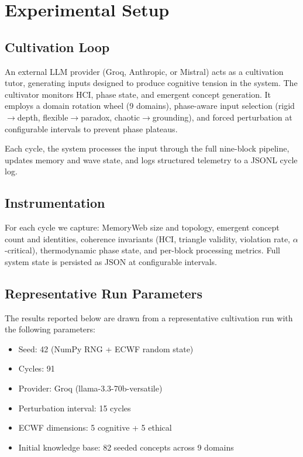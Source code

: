 \documentclass[11pt,a4paper]{article}
\begin{document}
\section{Experimental Setup}

\subsection{Cultivation Loop}

An external LLM provider (Groq, Anthropic, or Mistral) acts as a cultivation 
tutor, generating inputs designed to produce cognitive tension in the system. 
The cultivator monitors HCI, phase state, and emergent concept generation. It 
employs a domain rotation wheel (9 domains), phase-aware input selection 
(rigid$\to$depth, flexible$\to$paradox, chaotic$\to$grounding), and forced 
perturbation at configurable intervals to prevent phase plateaus.

Each cycle, the system processes the input through the full nine-block 
pipeline, updates memory and wave state, and logs structured telemetry 
to a JSONL cycle log.

\subsection{Instrumentation}

For each cycle we capture: MemoryWeb size and topology, emergent concept 
count and identities, coherence invariants (HCI, triangle validity, violation 
rate, $\alpha$-critical), thermodynamic phase state, and per-block processing 
metrics. Full system state is persisted as JSON at configurable intervals.

\subsection{Representative Run Parameters}

The results reported below are drawn from a representative cultivation run 
with the following parameters:

\begin{itemize}[nosep]
    \item Seed: 42 (NumPy RNG + ECWF random state)
    \item Cycles: 91
    \item Provider: Groq (llama-3.3-70b-versatile)
    \item Perturbation interval: 15 cycles
    \item ECWF dimensions: 5 cognitive + 5 ethical
    \item Initial knowledge base: 82 seeded concepts across 9 domains
\end{itemize}
\end{document}
